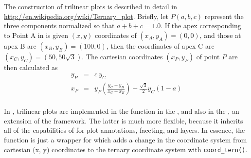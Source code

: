 \documentclass[11pt]{book}
\begin{document}
The construction of trilinear plots is described in detail
in \url{http://en.wikipedia.org/wiki/Ternary_plot}.
Briefly, let $P(a, b, c)$ represent the three components  normalized so
that $a + b + c = 1.0$.
If the apex corresponding to Point A in 
is given $(x, y)$ coordinates of $(x_A, y_A) = (0, 0)$,
and those at apex B are $(x_B, y_B) = (100, 0)$,
then the coordinates of apex C are $(x_C, y_C) = (50, 50\sqrt{3})$.
The cartesian coordinates $(x_P, y_P)$  of point $P$ are then calculated as
\begin{eqnarray*}
y_P & = & c \: y_C \\
x_P & = & y_P \left( \frac{y_C - y_B}{x_C - x_B} \right)
+ \frac{\sqrt{3}}{2} y_C (1 - a) \\
\end{eqnarray*}

In \R, trilinear plots are implemented in the
 function in the ,
and also in the , an extension of
the  framework.  The latter is much more
flexible, because it inherits all of the capabilities
of  for plot annotations, faceting, and layers.
In essence,
the function  is just a wrapper for
 which adds a change in the coordinate
system from cartesian (x, y) coordinates to the
ternary coordinate system with \verb|coord_tern()|.
\end{document}
